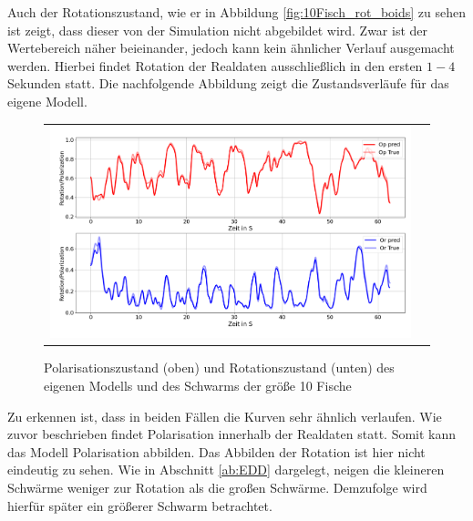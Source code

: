 Auch der Rotationszustand, wie er in Abbildung \ref{fig:10Fisch_rot_boids} zu sehen ist zeigt, dass dieser von der Simulation nicht abgebildet wird. Zwar ist der Wertebereich näher beieinander, jedoch kann kein ähnlicher Verlauf ausgemacht werden.
Hierbei findet Rotation der Realdaten ausschließlich in den ersten $1-4$ Sekunden statt.
Die nachfolgende Abbildung zeigt die Zustandsverläufe für das eigene Modell.

\begin{figure}[H]
\centering
\begin{tabular}{cc}
\includegraphics[width=1.0\textwidth]{figures/Experimente/Realdaten/PWD_10F_zust.png} 
\end{tabular}
\caption{Polarisationszustand (oben) und Rotationszustand (unten) des eigenen Modells und des Schwarms der größe 10 Fische\label{fig:10Fisch}}
\end{figure}

Zu erkennen ist, dass in beiden Fällen die Kurven sehr ähnlich verlaufen. Wie zuvor beschrieben findet Polarisation innerhalb der Realdaten statt. Somit kann das Modell Polarisation abbilden. Das Abbilden der Rotation ist hier nicht eindeutig zu sehen. Wie in Abschnitt \ref{ab:EDD} dargelegt, neigen die kleineren Schwärme weniger zur Rotation als die großen Schwärme. Demzufolge wird hierfür später ein größerer Schwarm betrachtet.

